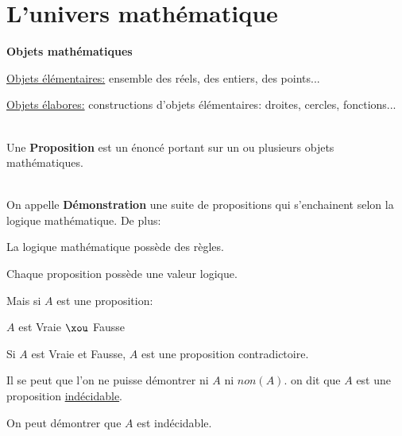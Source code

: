 \documentclass[12pt,twoside,a4paper]{article}
\author{MPSI 2}
\begin{document}
	\maketitle
	\section{L'univers math\'ematique}
		\begin{liste}
			\item\textbf{Objets math\'ematiques}
				\begin{tab}\begin{liste}
					\item \underline{Objets \'el\'ementaires:} ensemble des r\'eels, des entiers, des points...
					\item \underline{Objets \'elabores:} constructions d'objets \'el\'ementaires: droites, cercles, fonctions...\\\\
				\end{liste}\end{tab}
			\item Une \textbf{Proposition} est un \'enonc\'e portant sur un ou plusieurs objets math\'ematiques.\\\\
			\item On appelle \textbf{D\'emonstration} une suite de propositions qui s'enchainent selon la logique math\'ematique. De plus:
				\begin{liste}
					\item La logique math\'ematique poss\`ede des r\`egles.
					\item Chaque proposition poss\`ede une valeur logique.\\
				\end{liste}
				Mais si $A$ est une proposition:
				\begin{liste}
					\item $A$ est Vraie $\xou$ Fausse
					\item Si $A$ est Vraie et Fausse, $A$ est une proposition contradictoire.
					\item Il se peut que l'on ne puisse d\'emontrer ni $A$ ni $non(A)$. on dit que $A$ est une proposition \underline{ind\'ecidable}.
					\item On peut d\'emontrer que $A$ est ind\'ecidable.
				\end{liste}
		\end{liste}
\end{document}
